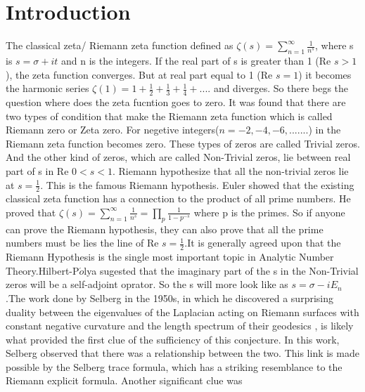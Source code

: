 \documentclass[12pt]{report}
\newcommand*{\1}{\hspace{1pt}}
\begin{document}
    \tableofcontents

    \newpage
    \chapter{Introduction}
    The classical zeta/ Riemann zeta function defined as $\zeta(s) = \sum _{n=1}^{\infty} \frac{1}{n^{s}}$\cite{s3}, where s is $s=\sigma + it$ and n is the integers. If the real part of s is greater
    than 1 (Re $s > 1$), the zeta function converges. But at real part equal to 1 (Re $s = 1$) it becomes the harmonic series $\zeta(1) = 1 + \frac{1}{2} + \frac{1}{3} + 
    \frac{1}{4} + ....$ and diverges. So there begs the question where does the zeta fucntion goes to zero. It was found that there are two types of condition that make 
    the Riemann zeta function which is called Riemann zero or Zeta zero. For negetive integers($n=-2,-4,-6,.......$) in the Riemann zeta function becomes zero. These types of zeros are called
    Trivial zeros. And the other kind of zeros, which are called Non-Trivial zeros, lie between real part of s in Re $0<s<1$. Riemann hypothesize that all the non-trivial zeros
    lie at $s=\frac{1}{2}$. This is the famous Riemann hypothesis. Euler showed that the existing classical zeta function has a connection to the product of all prime numbers.
    He proved that $\zeta(s) = \sum_{n=1}^{\infty} \frac{1}{n^{s}} = \prod _{p} \frac{1}{1-p^{-s}}$ where p is the primes. So if anyone can prove the Riemann hypothesis, they
    can also prove that all the prime numbers must be lies the line of Re $ s = \frac{1}{2}$.It is generally agreed upon that the Riemann Hypothesis is the single most important topic in 
    Analytic Number Theory\cite{s27,s28,s29,s30}.Hilbert-P$\acute{o}$lya sugested that the imaginary part of the s in the Non-Trivial
    zeros will be a self-adjoint oprator\cite{s31,s32,s33}. So the s will more look like as $s=\sigma - iE_{n}$.The work done by Selberg in the 1950s, in which he
    discovered a surprising duality between the eigenvalues of the Laplacian acting on Riemann surfaces with constant negative curvature and the length spectrum of their
    geodesics \cite{s34}, is likely what provided the first clue of the sufficiency of this conjecture. In this work, Selberg observed that there was a relationship between 
    the two. This link is made possible by the Selberg trace formula, which has a striking resemblance to the Riemann explicit formula. Another significant clue was 
\end{document}
